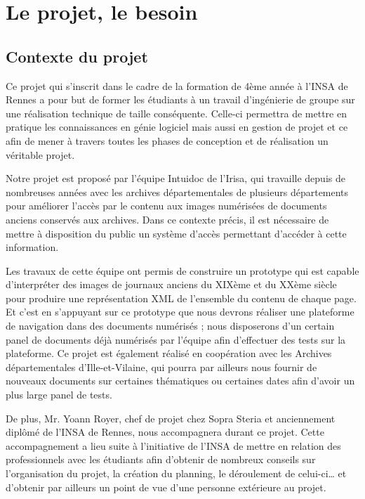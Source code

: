 \section{Le projet, le besoin}
\label{sec:intro}

    \subsection{Contexte du projet}
    \label{subsec:contexte}
    Ce projet qui s’inscrit dans le cadre de la formation de 4ème année à l’INSA de Rennes a pour but
    de former les étudiants à un travail d’ingénierie de groupe sur une réalisation technique de taille conséquente.
    Celle-ci permettra de mettre en pratique les connaissances en génie logiciel mais aussi en gestion
    de projet et ce afin de mener à travers toutes les phases de conception et de réalisation un véritable projet.

    Notre projet est proposé par l’équipe Intuidoc de l’Irisa, qui travaille depuis de nombreuses années
    avec les archives départementales de plusieurs départements pour améliorer l’accès par le contenu
    aux images numérisées de documents anciens conservés aux archives. Dans ce contexte précis,
    il est nécessaire de mettre à disposition du public un système d’accès permettant d’accéder à cette information.

    Les travaux de cette équipe ont permis de construire un prototype qui est capable d’interpréter des images
    de journaux anciens du XIXème et du XXème siècle pour produire une représentation XML de l’ensemble du contenu
    de chaque page. Et c’est en s’appuyant sur ce prototype que nous devrons réaliser une plateforme de navigation
    dans des documents numérisés ; nous disposerons d’un certain panel de documents déjà numérisés par l’équipe afin
    d’effectuer des tests sur la plateforme. Ce projet est également réalisé en coopération avec les Archives départementales
    d’Ille-et-Vilaine, qui pourra par ailleurs nous fournir de nouveaux documents sur certaines thématiques ou certaines
    dates afin d’avoir un plus large panel de tests.

    De plus, Mr. Yoann Royer, chef de projet chez Sopra Steria et anciennement diplômé de l’INSA de Rennes,
    nous accompagnera durant ce projet. Cette accompagnement a lieu suite à l’initiative de l’INSA de mettre
    en relation des professionnels avec les étudiants afin d’obtenir de nombreux conseils sur l’organisation du projet,
    la création du planning, le déroulement de celui-ci… et d’obtenir par ailleurs un point de vue d’une personne extérieure au projet.



